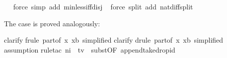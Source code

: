 \begin{isabellebody}
\ \ \isamarkupfalse%
{}force\ simp\ add{}\ min{}less{}iff{}disj{}\isanewline
\ \isamarkupfalse%
{}force\ split\ add{}\ nat{}diff{}split{}%
\begin{isamarkuptxt}%
The case  is proved analogously:%
\end{isamarkuptxt}%
\isamarkuptrue%
\isamarkupfalse%
{}clarify{}\isanewline
{}\isamarkupfalse%
{}frule\ part{}{}of\ {}{}x{}\ x{}b{}{}\ simplified{}{}\isanewline
{}\isamarkupfalse%
{}clarify{}\isanewline
{}\isamarkupfalse%
{}drule\ part{}{}of\ {}{}x{}\ x{}b{}{}\ simplified{}{}\isanewline
\ \isamarkupfalse%
{}assumption{}\isanewline
{}\isamarkupfalse%
{}rule{}tac\ n{}{}i\ \ t{}v\ \ subst{}OF\ append{}take{}drop{}id{}{}\isanewline

\end{isabellebody}
